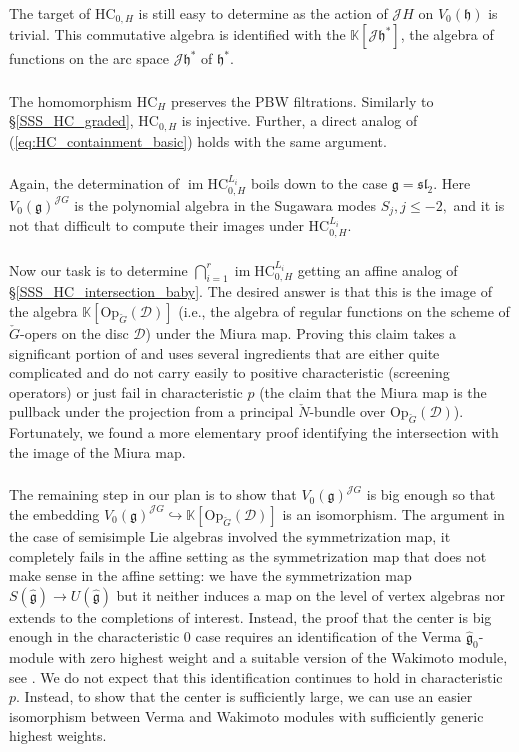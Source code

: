 \documentclass{amsart}
\theoremstyle{definition}
\newcommand{\slf}{\mathfrak{sl}}
\newcommand{\sss}{\subsubsection{}}
\newcommand{\D}{\sD}
\newcommand{\sD}{\mathscr{D}}
\newcommand{\on}{\mathrm}
\newcommand{\g}{\mathfrak{g}}
\newcommand{\h}{\mathfrak{h}}
\newcommand{\HC}{\mathrm{HC}} %
\newcommand{\Jet}{\mathscr{J}}
\newcommand{\Op}{\on{Op}}
\newcommand{\bK}{\mathbb{K}}
\renewcommand{\bK}{\mathbb{K}} %
\numberwithin{equation}{section}
\begin{document}
\sss The target of $\HC_{0,H}$ is still easy to determine as the action of $\Jet H$ on $V_0(\h)$ is trivial. This commutative algebra is identified with 
the $\bK[\Jet \h^*]$, the algebra of functions on the arc space $\Jet\h^*$ of $\h^*$.

\sss\label{SSS_HC_PBW_injectivity} The homomorphism $\HC_H$ preserves the PBW filtrations. Similarly to \S\ref{SSS_HC_graded},
$\HC_{0,H}$ is injective. Further,  a direct analog of (\ref{eq:HC_containment_basic})
holds with the same argument.

\sss Again, the determination of $\operatorname{im}\HC_{0,H}^{L_i}$ boils down to the case $\g=\slf_2$. Here $V_0(\g)^{\Jet G}$ is the polynomial algebra in the Sugawara modes $S_j, j\leqslant -2,$ and it is not that difficult to compute their images under $\HC_{0,H}^{L_i}$.

\sss\label{SSS:opers_image_intro} Now our task is to determine $\bigcap_{i=1}^r\operatorname{im}\HC_{0,H}^{L_i}$ getting an affine analog of \S\ref{SSS_HC_intersection_baby}.
The desired answer is that this is the image of the algebra $\bK[\Op_{\check{G}}(\D)]$ (i.e., the algebra of regular functions on the scheme of $\check{G}$-opers on the disc $\D$) under the Miura map. Proving this claim takes a significant portion of \cite[Secs. 7,8.2]{Frenkel_loop} and uses several ingredients that are either quite complicated and do not carry easily to positive characteristic (screening operators) or just fail in characteristic $p$ (the claim that the Miura map is the pullback under the projection from a principal $\check{N}$-bundle over $\Op_{\check{G}}(\D)$). Fortunately, we found a  more elementary proof identifying the intersection with the image of the Miura map.   

\sss\label{SSS:center_affine_big_intro}
The remaining step in our plan is to show that 
$V_0(\g)^{\Jet G}$ is big enough so that the embedding $V_0(\g)^{\Jet G}\hookrightarrow \bK[\Op_{\check{G}}(\D)]$ is an isomorphism. The argument in the case of semisimple Lie algebras involved the symmetrization map, it completely fails in the affine setting as the symmetrization map that does not make sense in the affine setting: we have the symmetrization map $S(\hat{\g})\rightarrow U(\hat{\g})$ but it neither induces a map on the level of vertex algebras nor extends to the completions of interest. Instead, the proof that the center is big enough in the characteristic $0$ case requires an identification of the Verma $\hat{\g}_0$-module with zero highest weight
and a suitable version of the Wakimoto module, see 
\cite[Secs. 6.3, 8.1]{Frenkel_loop}. We do not expect that this identification continues to hold in characteristic $p$. Instead, to show that the center is sufficiently large, we can use an easier isomorphism between Verma and Wakimoto modules with sufficiently generic highest weights.  
\end{document}
